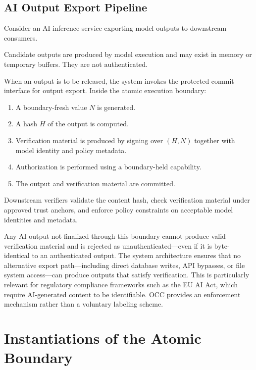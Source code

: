 \documentclass[11pt,letterpaper]{article}
\theoremstyle{occplain}
\theoremstyle{occremark}
\begin{document}
\subsection{AI Output Export Pipeline}
\label{sec:ai-pipeline}

Consider an AI inference service exporting model outputs to downstream consumers.

Candidate outputs are produced by model execution and may exist in memory or temporary buffers. They are not authenticated.

When an output is to be released, the system invokes the protected commit interface for output export. Inside the atomic execution boundary:
\begin{enumerate}
  \item A boundary-fresh value $N$ is generated.
  \item A hash $H$ of the output is computed.
  \item Verification material is produced by signing over $(H, N)$ together with model identity and policy metadata.
  \item Authorization is performed using a boundary-held capability.
  \item The output and verification material are committed.
\end{enumerate}

Downstream verifiers validate the content hash, check verification material under approved trust anchors, and enforce policy constraints on acceptable model identities and metadata.

Any AI output not finalized through this boundary cannot produce valid verification material and is rejected as unauthenticated---even if it is byte-identical to an authenticated output. The system architecture ensures that no alternative export path---including direct database writes, API bypasses, or file system access---can produce outputs that satisfy verification. This is particularly relevant for regulatory compliance frameworks such as the EU AI Act, which require AI-generated content to be identifiable. OCC provides an enforcement mechanism rather than a voluntary labeling scheme.


\section{Instantiations of the Atomic Boundary}
\label{sec:instantiations}
\end{document}
